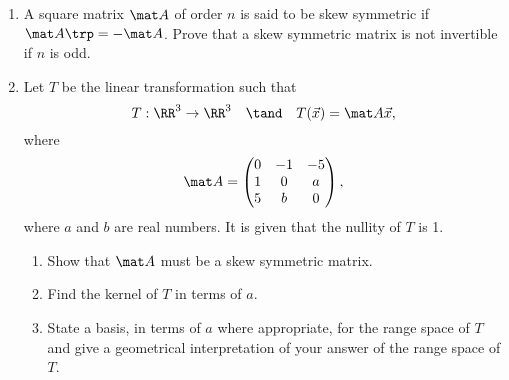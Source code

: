 \clearpage
\begin{problem}
    \begin{enumerate}
        \item A square matrix $\mat A$ of order $n$ is said to be skew symmetric if $\mat A \trp = - \mat A$. Prove that a skew symmetric matrix is not invertible if $n$ is odd.
        \item Let $T$ be the linear transformation such that \[T : \RR^3 \to \RR^3 \quad \tand \quad T(\vec x) = \mat A \vec x,\] where \[\mat A = \begin{pmatrix}0 & -1 & -5 \\ 1 & 0 & a \\ 5 & b & 0\end{pmatrix},\] where $a$ and $b$ are real numbers. It is given that the nullity of $T$ is 1.
        \begin{enumerate}
            \item Show that $\mat A$ must be a skew symmetric matrix.
            \item Find the kernel of $T$ in terms of $a$.
            \item State a basis, in terms of $a$ where appropriate, for the range space of $T$ and give a geometrical interpretation of your answer of the range space of $T$.
        \end{enumerate}
    \end{enumerate}
\end{problem}
